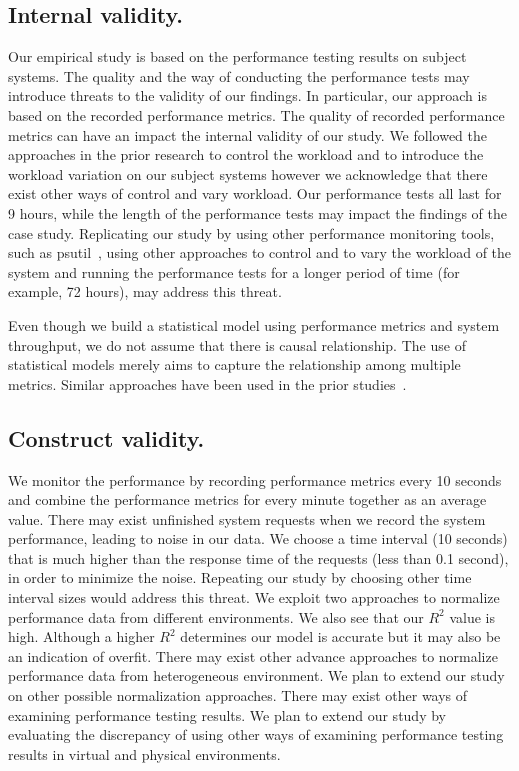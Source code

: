 \documentclass[smallextended]{svjour3}       %
\begin{document}
\subsection{Internal validity.}

Our empirical study is based on the performance testing results on subject systems. The quality and the way of conducting the performance tests may introduce threats to the validity of our findings. In particular, our approach is based on the recorded performance metrics. The quality of recorded performance metrics can have an impact the internal validity of our study. We followed the approaches in the prior research to control the workload and to introduce the workload variation on our subject systems however we acknowledge that there exist other ways of control and vary workload. Our performance tests all last for 9 hours, while the length of the performance tests may impact the findings of the case study. Replicating our study by using other performance monitoring tools, such as psutil~\cite{psutil}, using other approaches to control and to vary the workload of the system and running the performance tests for a longer period of time (for example, 72 hours), may address this threat.

Even though we build a statistical model using performance metrics and system throughput, we do not assume that there is causal relationship. The use of statistical models merely aims to capture the relationship among multiple metrics. Similar approaches have been used in the prior studies~\cite{Cohen:2005:CIC:1095810.1095821, Shang:2015:ADP:2668930.2688052, xiong2013vperfguard}. 



\subsection{Construct validity.}
We monitor the performance by recording performance metrics every 10 seconds and combine the performance metrics for every minute together as an average value. There may exist unfinished system requests when we record the system performance, leading to noise in our data. We choose a time interval (10 seconds) that is much higher than the response time of the requests (less than 0.1 second), in order to minimize the noise. Repeating our study by choosing other time interval sizes would address this threat. We exploit two approaches to normalize performance data from different environments. We also see that our {$R^2$} value is high. Although a higher {$R^2$} determines our model is accurate but it may also be an indication of overfit. There may exist other advance approaches to normalize performance data from heterogeneous environment. We plan to extend our study on other possible normalization approaches. There may exist other ways of examining performance testing results. We plan to extend our study by evaluating the discrepancy of using other ways of examining performance testing results in virtual and physical environments.
\end{document}
